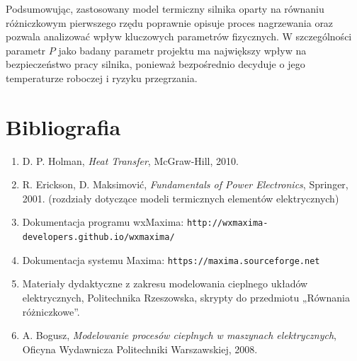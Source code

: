 \documentclass[a4paper,12pt]{article}
\begin{document}
	Podsumowując, zastosowany model termiczny silnika oparty na równaniu różniczkowym pierwszego rzędu poprawnie opisuje proces nagrzewania oraz pozwala analizować wpływ kluczowych parametrów fizycznych. W szczególności parametr \(P\) jako badany parametr projektu ma największy wpływ na bezpieczeństwo pracy silnika, ponieważ bezpośrednio decyduje o jego temperaturze roboczej i ryzyku przegrzania.
	
	
	
	
	
	\newpage
	\section{Bibliografia}
	
	\begin{enumerate}
		
		
		\item D. P. Holman, 
		\textit{Heat Transfer}, McGraw-Hill, 2010.
		
		\item R. Erickson, D. Maksimović, 
		\textit{Fundamentals of Power Electronics}, Springer, 2001.  
		(rozdziały dotyczące modeli termicznych elementów elektrycznych)
		
		\item Dokumentacja programu wxMaxima:  
		\texttt{http://wxmaxima-developers.github.io/wxmaxima/}
		
		\item Dokumentacja systemu Maxima:  
		\texttt{https://maxima.sourceforge.net}
		
		\item Materiały dydaktyczne z zakresu modelowania cieplnego układów elektrycznych,  
		Politechnika Rzeszowska, skrypty do przedmiotu „Równania różniczkowe”.
		
		\item A. Bogusz,  
		\textit{Modelowanie procesów cieplnych w maszynach elektrycznych},  
		Oficyna Wydawnicza Politechniki Warszawskiej, 2008.
	\end{enumerate}
	
\end{document}
